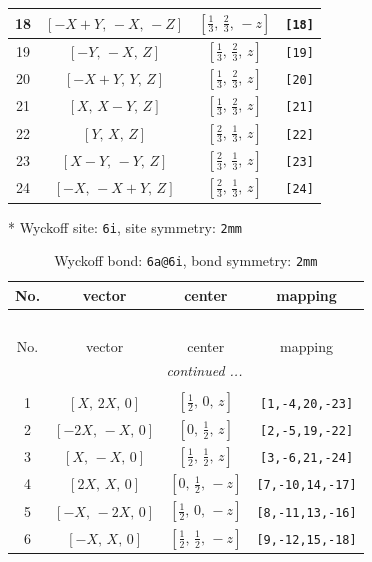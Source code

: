 \documentclass[fleqn,8pt]{jsarticle}
\begin{document}
\begin{longtable}{cccc}
18 & $\left[ - X + Y,\, - X,\, - Z \right]$ & $\left[ \frac{1}{3},\, \frac{2}{3},\, - z \right]$ & {\tt [18]} \\ \hline
19 & $\left[ - Y,\, - X,\, Z \right]$ & $\left[ \frac{1}{3},\, \frac{2}{3},\, z \right]$ & {\tt [19]} \\ \hline
20 & $\left[ - X + Y,\, Y,\, Z \right]$ & $\left[ \frac{1}{3},\, \frac{2}{3},\, z \right]$ & {\tt [20]} \\ \hline
21 & $\left[ X,\, X - Y,\, Z \right]$ & $\left[ \frac{1}{3},\, \frac{2}{3},\, z \right]$ & {\tt [21]} \\ \hline
22 & $\left[ Y,\, X,\, Z \right]$ & $\left[ \frac{2}{3},\, \frac{1}{3},\, z \right]$ & {\tt [22]} \\ \hline
23 & $\left[ X - Y,\, - Y,\, Z \right]$ & $\left[ \frac{2}{3},\, \frac{1}{3},\, z \right]$ & {\tt [23]} \\ \hline
24 & $\left[ - X,\, - X + Y,\, Z \right]$ & $\left[ \frac{2}{3},\, \frac{1}{3},\, z \right]$ & {\tt [24]} \\
\end{longtable}
* Wyckoff site: {\tt 6i}, site symmetry: {\tt 2mm}
\renewcommand{\arraystretch}{1.2}
\begin{longtable}{cccc}
\caption{Wyckoff bond: {\tt 6a@6i}, bond symmetry: {\tt 2mm}}
 \\
 \hline \hline
No. & vector & center & mapping \\ \hline \endfirsthead

\multicolumn{3}{l}{\tablename\ \thetable{}} \\
 \hline \hline
No. & vector & center & mapping \\ \hline \endhead

 \hline \hline
\multicolumn{3}{r}{\footnotesize\it continued ...} \\ \endfoot

 \hline \hline
\multicolumn{3}{r}{} \\ \endlastfoot

1 & $\left[ X,\, 2 X,\, 0 \right]$ & $\left[ \frac{1}{2},\, 0,\, z \right]$ & {\tt [1,-4,20,-23]} \\ \hline
2 & $\left[ - 2 X,\, - X,\, 0 \right]$ & $\left[ 0,\, \frac{1}{2},\, z \right]$ & {\tt [2,-5,19,-22]} \\ \hline
3 & $\left[ X,\, - X,\, 0 \right]$ & $\left[ \frac{1}{2},\, \frac{1}{2},\, z \right]$ & {\tt [3,-6,21,-24]} \\ \hline
4 & $\left[ 2 X,\, X,\, 0 \right]$ & $\left[ 0,\, \frac{1}{2},\, - z \right]$ & {\tt [7,-10,14,-17]} \\ \hline
5 & $\left[ - X,\, - 2 X,\, 0 \right]$ & $\left[ \frac{1}{2},\, 0,\, - z \right]$ & {\tt [8,-11,13,-16]} \\ \hline
6 & $\left[ - X,\, X,\, 0 \right]$ & $\left[ \frac{1}{2},\, \frac{1}{2},\, - z \right]$ & {\tt [9,-12,15,-18]} \\
\end{longtable}
\end{document}
